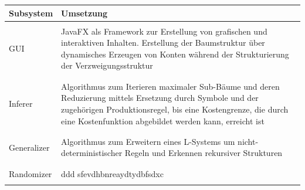 \documentclass[11pt]{article}
\begin{document}
    \begin{center}
        \begin{tabular}{l|l}
            \textbf{Subsystem} & \textbf{Umsetzung} \\
            \hline \\
            GUI &
            \begin{minipage}[t]{0.8\textwidth}
               JavaFX als Framework zur Erstellung von grafischen und interaktiven Inhalten.
                Erstellung der Baumstruktur über dynamisches Erzeugen von Konten während der Strukturierung der
               Verzweigungsstruktur
            \end{minipage} \\
            \\ \hline \\
            Inferer &
            \begin{minipage}[t]{0.8\textwidth}
                Algorithmus zum Iterieren maximaler Sub-Bäume und deren Reduzierung mittels Ersetzung durch Symbole
                und der zugehörigen Produktionsregel, bis eine Kostengrenze, die durch eine Kostenfunktion abgebildet
                werden kann, erreicht ist
            \end{minipage} \\
            \\ \hline \\
            Generalizer &
            \begin{minipage}[t]{0.8\textwidth}
                Algorithmus zum Erweitern eines L-Systems um nicht-deterministischer Regeln und Erkennen rekursiver
                Strukturen
            \end{minipage} \\
            \\ \hline \\
            Randomizer &
            \begin{minipage}[t]{0.8\textwidth}
    ddd         sfevdhbnreaydtydbfsdxc
            \end{minipage} \\
            \\ \hline
        \end{tabular}
    \end{center}
\end{document}
